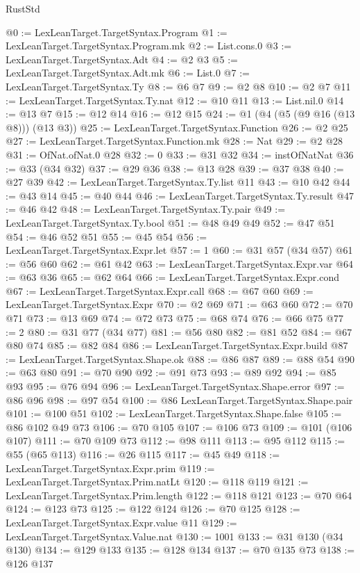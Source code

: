 \begin{lexlean}{RustStd}
\begin{coremodule}
@0 := LexLeanTarget.TargetSyntax.Program
@1 := LexLeanTarget.TargetSyntax.Program.mk
@2 := List.cons.{0}
@3 := LexLeanTarget.TargetSyntax.Adt
@4 := @2 @3
@5 := LexLeanTarget.TargetSyntax.Adt.mk
@6 := List.{0}
@7 := LexLeanTarget.TargetSyntax.Ty
@8 := @6 @7
@9 := @2 @8
@10 := @2 @7
@11 := LexLeanTarget.TargetSyntax.Ty.nat
@12 := @10 @11
@13 := List.nil.{0}
@14 := @13 @7
@15 := @12 @14
@16 := @12 @15
@24 := @1 (@4 (@5 (@9 @16 (@13 @8))) (@13 @3))
@25 := LexLeanTarget.TargetSyntax.Function
@26 := @2 @25
@27 := LexLeanTarget.TargetSyntax.Function.mk
@28 := Nat
@29 := @2 @28
@31 := OfNat.ofNat.{0} @28
@32 := 0
@33 := @31 @32
@34 := instOfNatNat
@36 := @33 (@34 @32)
@37 := @29 @36
@38 := @13 @28
@39 := @37 @38
@40 := @27 @39
@42 := LexLeanTarget.TargetSyntax.Ty.list @11
@43 := @10 @42
@44 := @43 @14
@45 := @40 @44
@46 := LexLeanTarget.TargetSyntax.Ty.result
@47 := @46 @42
@48 := LexLeanTarget.TargetSyntax.Ty.pair
@49 := LexLeanTarget.TargetSyntax.Ty.bool
@51 := @48 @49 @49
@52 := @47 @51
@54 := @46 @52 @51
@55 := @45 @54
@56 := LexLeanTarget.TargetSyntax.Expr.let
@57 := 1
@60 := @31 @57 (@34 @57)
@61 := @56 @60
@62 := @61 @42
@63 := LexLeanTarget.TargetSyntax.Expr.var
@64 := @63 @36
@65 := @62 @64
@66 := LexLeanTarget.TargetSyntax.Expr.cond
@67 := LexLeanTarget.TargetSyntax.Expr.call
@68 := @67 @60
@69 := LexLeanTarget.TargetSyntax.Expr
@70 := @2 @69
@71 := @63 @60
@72 := @70 @71
@73 := @13 @69
@74 := @72 @73
@75 := @68 @74
@76 := @66 @75
@77 := 2
@80 := @31 @77 (@34 @77)
@81 := @56 @80
@82 := @81 @52
@84 := @67 @80 @74
@85 := @82 @84
@86 := LexLeanTarget.TargetSyntax.Expr.build
@87 := LexLeanTarget.TargetSyntax.Shape.ok
@88 := @86 @87
@89 := @88 @54
@90 := @63 @80
@91 := @70 @90
@92 := @91 @73
@93 := @89 @92
@94 := @85 @93
@95 := @76 @94
@96 := LexLeanTarget.TargetSyntax.Shape.error
@97 := @86 @96
@98 := @97 @54
@100 := @86 LexLeanTarget.TargetSyntax.Shape.pair
@101 := @100 @51
@102 := LexLeanTarget.TargetSyntax.Shape.false
@105 := @86 @102 @49 @73
@106 := @70 @105
@107 := @106 @73
@109 := @101 (@106 @107)
@111 := @70 @109 @73
@112 := @98 @111
@113 := @95 @112
@115 := @55 (@65 @113)
@116 := @26 @115
@117 := @45 @49
@118 := LexLeanTarget.TargetSyntax.Expr.prim
@119 := LexLeanTarget.TargetSyntax.Prim.natLt
@120 := @118 @119
@121 := LexLeanTarget.TargetSyntax.Prim.length
@122 := @118 @121
@123 := @70 @64
@124 := @123 @73
@125 := @122 @124
@126 := @70 @125
@128 := LexLeanTarget.TargetSyntax.Expr.value @11
@129 := LexLeanTarget.TargetSyntax.Value.nat
@130 := 1001
@133 := @31 @130 (@34 @130)
@134 := @129 @133
@135 := @128 @134
@137 := @70 @135 @73
@138 := @126 @137

\end{coremodule}
\end{lexlean}
